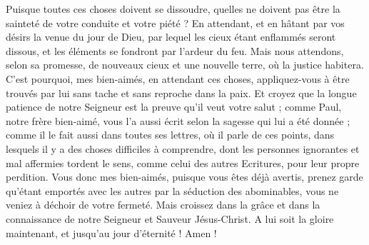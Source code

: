 \begin{multicols}{2}
Puisque toutes ces choses doivent se dissoudre, quelles ne doivent pas être la sainteté de votre conduite et votre piété ?
En attendant, et en hâtant par vos désirs la venue du jour de Dieu, par lequel les cieux étant enflammés seront dissous, et les éléments se fondront par l'ardeur du feu.
Mais nous attendons, selon sa promesse, de nouveaux cieux et une nouvelle terre{}, où la justice habitera.
C'est pourquoi, mes bien-aimés, en attendant ces choses, appliquez-vous à être trouvés par lui sans tache et sans reproche dans la paix.
Et croyez que la longue patience de notre Seigneur est la preuve qu'il veut votre salut ; comme Paul, notre frère bien-aimé, vous l’a aussi écrit selon la sagesse qui lui a été donnée ;
comme il le fait aussi dans toutes ses lettres, où il parle de ces points, dans lesquels il y a des choses difficiles à comprendre, dont les personnes ignorantes et mal affermies tordent le sens{}, comme celui des autres Ecritures, pour leur propre perdition.
\TextTitle{[Conclusion]}
Vous donc mes bien-aimés, puisque vous êtes déjà avertis, prenez garde qu'étant emportés avec les autres par la séduction des abominables, vous ne veniez à déchoir de votre fermeté.
Mais croissez dans la grâce et dans la connaissance de notre Seigneur et Sauveur Jésus-Christ. A lui soit la gloire maintenant, et jusqu'au jour d'éternité ! Amen !
\PPE{}
\end{multicols}
